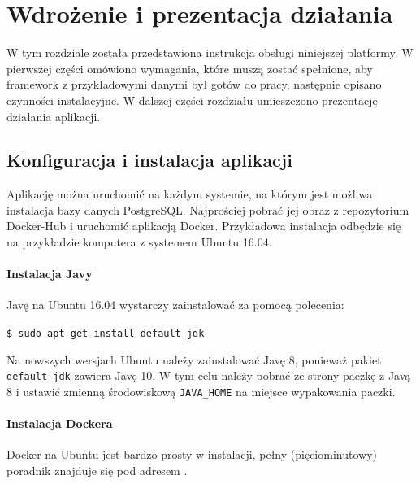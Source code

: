 \chapter{Wdrożenie i prezentacja działania}
\thispagestyle{chapterBeginStyle}

W tym rozdziale została przedstawiona instrukcja obsługi niniejszej platformy. W pierwszej części omówiono wymagania, które muszą zostać spełnione, aby framework z przykładowymi danymi był gotów do pracy, następnie opisano czynności instalacyjne. 
W dalszej części rozdziału umieszczono prezentację działania aplikacji.  

\section{Konfiguracja i instalacja aplikacji}
Aplikację można uruchomić na każdym systemie, na którym jest możliwa instalacja bazy danych PostgreSQL. Najprościej pobrać jej obraz z repozytorium Docker-Hub i uruchomić aplikacją Docker. Przykładowa instalacja odbędzie się na przykładzie komputera z systemem Ubuntu 16.04. 

\subsubsection{Instalacja Javy}
Javę na Ubuntu 16.04 wystarczy zainstalować za pomocą polecenia:

\noindent
\texttt{\$ sudo apt-get install default-jdk}

\noindent
Na nowszych wersjach Ubuntu należy zainstalować Javę 8, ponieważ pakiet \texttt{default-jdk} zawiera Javę 10. W tym celu należy pobrać ze strony \cite{Java-doc} paczkę z Javą 8 i ustawić zmienną środowiskową \texttt{JAVA\_HOME} na miejsce wypakowania paczki. 

\subsubsection{Instalacja Dockera}
Docker na Ubuntu jest bardzo prosty w instalacji, pełny (pięciominutowy) poradnik znajduje się pod adresem \cite{docker-ins}.


